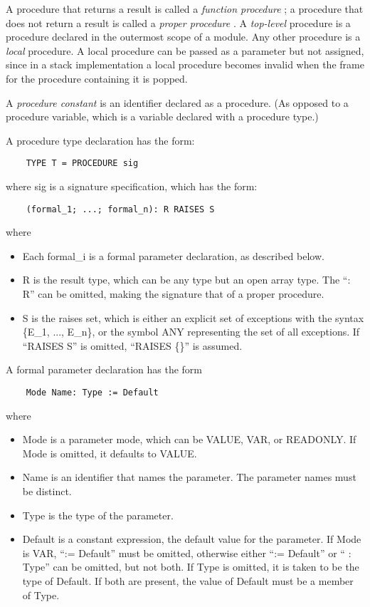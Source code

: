\documentclass[10pt]{article}
\begin{document}
A procedure that returns a result is called a \emph{function procedure}
; a procedure that does not return a result is called a \emph{proper procedure}
. A \emph{top-level}
procedure is a procedure declared in the outermost scope of a module. Any other procedure is a \emph{local}
procedure. A local procedure can be passed as a parameter but not assigned, since in a stack implementation a local procedure becomes invalid when the frame for the procedure containing it is popped.

A \emph{procedure constant} is an identifier declared as a procedure. (As
opposed to a procedure variable, which is a variable declared with a procedure
type.)

A procedure type declaration has the form:
\begin{verbatim}
    TYPE T = PROCEDURE sig
\end{verbatim}
where sig is a signature specification, which has the form:
\begin{verbatim}
    (formal_1; ...; formal_n): R RAISES S
\end{verbatim}
where
\begin{itemize}
\item Each formal\_i is a formal parameter declaration, as described below.
\item R is the result type, which can be any type but an open array type. The ``: R'' can be omitted, making the signature that of a proper procedure.
\item S is the raises set, which is either an explicit set of exceptions with
  the syntax \{E\_1, ..., E\_n\}, or the symbol ANY representing the set of
  all exceptions. If ``RAISES S'' is omitted, ``RAISES \{\}'' is assumed.
\end{itemize}

A formal parameter declaration has the form
\begin{verbatim}
    Mode Name: Type := Default
\end{verbatim}
where
\begin{itemize}
\item Mode is a parameter mode, which can be VALUE, VAR, or READONLY. If Mode
  is omitted, it defaults to VALUE.
\item Name is an identifier that names the parameter. The parameter names must be distinct.
\item Type is the type of the parameter.
\item Default is a constant expression, the default value for the parameter. If Mode is VAR, ``:= Default'' must be omitted, otherwise either ``:= Default'' or `` : Type'' can be omitted, but not both. If Type is omitted, it is taken to be the type of Default. If both are present, the value of Default must be a member of Type.
\end{itemize}
\end{document}
